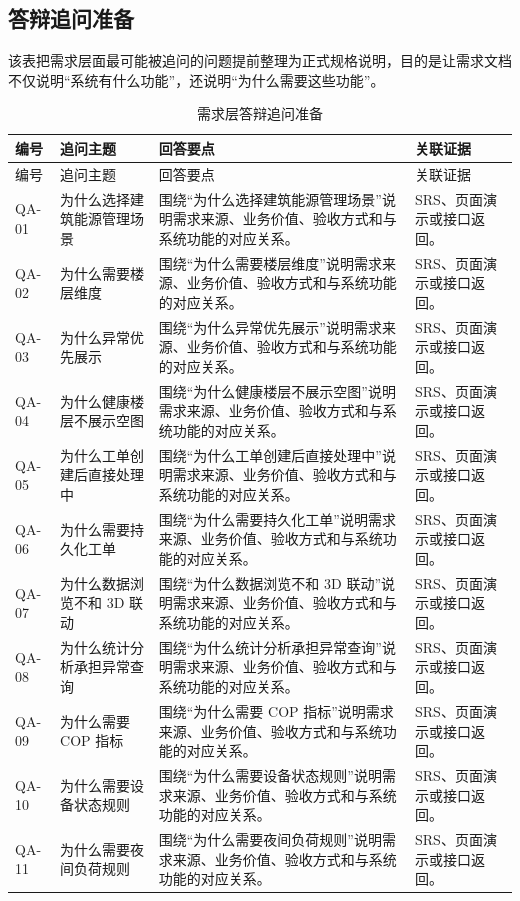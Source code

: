 \documentclass[12pt,a4paper]{ctexart}
\begin{document}
\subsection{答辩追问准备}
该表把需求层面最可能被追问的问题提前整理为正式规格说明，目的是让需求文档不仅说明“系统有什么功能”，还说明“为什么需要这些功能”。
\begin{longtable}{L{1.7cm}L{4.4cm}L{6.0cm}L{3.4cm}}
\caption{需求层答辩追问准备}\\
\toprule
编号 & 追问主题 & 回答要点 & 关联证据 \\
\midrule
\endfirsthead
\toprule
编号 & 追问主题 & 回答要点 & 关联证据 \\
\midrule
\endhead
QA-01 & 为什么选择建筑能源管理场景 & 围绕“为什么选择建筑能源管理场景”说明需求来源、业务价值、验收方式和与系统功能的对应关系。 & SRS、页面演示或接口返回。 \\
QA-02 & 为什么需要楼层维度 & 围绕“为什么需要楼层维度”说明需求来源、业务价值、验收方式和与系统功能的对应关系。 & SRS、页面演示或接口返回。 \\
QA-03 & 为什么异常优先展示 & 围绕“为什么异常优先展示”说明需求来源、业务价值、验收方式和与系统功能的对应关系。 & SRS、页面演示或接口返回。 \\
QA-04 & 为什么健康楼层不展示空图 & 围绕“为什么健康楼层不展示空图”说明需求来源、业务价值、验收方式和与系统功能的对应关系。 & SRS、页面演示或接口返回。 \\
QA-05 & 为什么工单创建后直接处理中 & 围绕“为什么工单创建后直接处理中”说明需求来源、业务价值、验收方式和与系统功能的对应关系。 & SRS、页面演示或接口返回。 \\
QA-06 & 为什么需要持久化工单 & 围绕“为什么需要持久化工单”说明需求来源、业务价值、验收方式和与系统功能的对应关系。 & SRS、页面演示或接口返回。 \\
QA-07 & 为什么数据浏览不和 3D 联动 & 围绕“为什么数据浏览不和 3D 联动”说明需求来源、业务价值、验收方式和与系统功能的对应关系。 & SRS、页面演示或接口返回。 \\
QA-08 & 为什么统计分析承担异常查询 & 围绕“为什么统计分析承担异常查询”说明需求来源、业务价值、验收方式和与系统功能的对应关系。 & SRS、页面演示或接口返回。 \\
QA-09 & 为什么需要 COP 指标 & 围绕“为什么需要 COP 指标”说明需求来源、业务价值、验收方式和与系统功能的对应关系。 & SRS、页面演示或接口返回。 \\
QA-10 & 为什么需要设备状态规则 & 围绕“为什么需要设备状态规则”说明需求来源、业务价值、验收方式和与系统功能的对应关系。 & SRS、页面演示或接口返回。 \\
QA-11 & 为什么需要夜间负荷规则 & 围绕“为什么需要夜间负荷规则”说明需求来源、业务价值、验收方式和与系统功能的对应关系。 & SRS、页面演示或接口返回。 \\

\end{longtable}
\end{document}
